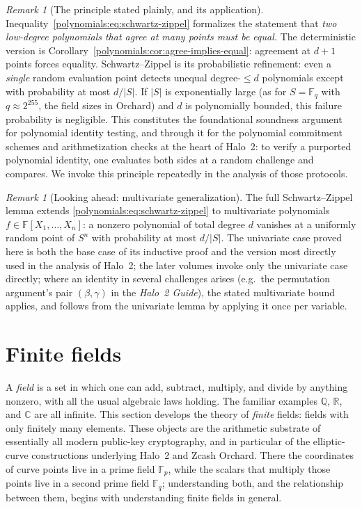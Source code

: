 \documentclass[11pt,a4paper]{article}
\theoremstyle{definition}
\theoremstyle{remark}
\newtheorem{remark}[theorem]{Remark}
\newcommand{\Q}{\ensuremath{\mathbb{Q}}}
\newcommand{\R}{\ensuremath{\mathbb{R}}}
\providecommand{\C}{}\renewcommand{\C}{\ensuremath{\mathbb{C}}}
\newcommand{\F}{\ensuremath{\mathbb{F}}}
\newcommand{\Fp}{\ensuremath{\mathbb{F}_{p}}}
\newcommand{\Fq}{\ensuremath{\mathbb{F}_{q}}}
\begin{document}
\begin{remark}[The principle stated plainly, and its application]
\label{polynomials:rem:sz-use}
Inequality~\eqref{polynomials:eq:schwartz-zippel} formalizes the statement that
\emph{two low-degree polynomials that agree at many points must be equal.} The
deterministic version is Corollary~\ref{polynomials:cor:agree-implies-equal}:
agreement at \(d + 1\) points forces equality. Schwartz--Zippel is its
probabilistic refinement: even a \emph{single} random evaluation point detects
unequal degree-\(\le d\) polynomials except with probability at most
\(d / |S|\). If \(|S|\) is exponentially large (as for \(S = \Fq\) with
\(q \approx 2^{255}\), the field sizes in Orchard) and \(d\) is polynomially
bounded, this failure probability is negligible. This constitutes the foundational
soundness argument for polynomial identity testing, and through it for the
polynomial commitment schemes and arithmetization checks at the heart of
Halo~2: to verify a purported polynomial identity, one evaluates both sides at a
random challenge and compares. We invoke this principle repeatedly in the
analysis of those protocols.
\end{remark}

\begin{remark}[Looking ahead: multivariate generalization]\label{polynomials:rem:multivariate}
The full Schwartz--Zippel lemma extends \eqref{polynomials:eq:schwartz-zippel} to
multivariate polynomials \(f \in \F[X_1, \dots, X_n]\): a nonzero polynomial of
total degree \(d\) vanishes at a uniformly random point of \(S^n\) with
probability at most \(d / |S|\). The univariate case proved here is both the base
case of its inductive proof and the version most directly used in the analysis of
Halo~2; the later volumes invoke only the univariate case directly; where an
identity in several challenges arises (e.g.\ the permutation argument's pair
\((\beta,\gamma)\) in the \emph{Halo~2 Guide}), the stated multivariate bound
applies, and follows from the univariate lemma by applying it once per variable.
\end{remark}

\clearpage

\section{Finite fields}\label{sec:finitefields}

A \emph{field} is a set in which one can add, subtract, multiply, and divide by anything nonzero, with all the usual algebraic laws holding. The familiar examples \(\Q\), \(\R\), and \(\C\) are all infinite. This section develops the theory of \emph{finite} fields: fields with only finitely many elements. These objects are the arithmetic substrate of essentially all modern public-key cryptography, and in particular of the elliptic-curve constructions underlying Halo~2 and Zcash Orchard. There the coordinates of curve points live in a prime field \(\Fp\), while the scalars that multiply those points live in a second prime field \(\Fq\); understanding both, and the relationship between them, begins with understanding finite fields in general.
\end{document}

